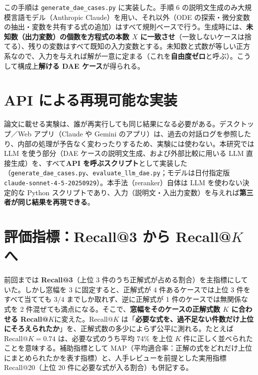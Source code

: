 \documentclass[11pt,a4paper]{ltjsarticle}
\begin{document}
この手順は \texttt{generate\_dae\_cases.py} に実装した。手順 6 の説明文生成のみ大規模言語モデル（Anthropic Claude）を用い、それ以外（ODE の探索・微分変数の抽出・変数を共有する式の追加）はすべて規則ベースで行う。生成時には、\textbf{未知数（出力変数）の個数を方程式の本数 $X$ に一致させ}（一致しないケースは捨てる）、残りの変数はすべて既知の入力変数とする。未知数と式数が等しい正方系なので、入力を与えれば解が一意に定まる（これを\textbf{自由度ゼロ}と呼ぶ）。こうして構成上\textbf{解ける DAE ケース}が得られる。

\section{API による再現可能な実装}\label{sec:api}
論文に載せる実験は、誰が再実行しても同じ結果になる必要がある。デスクトップ／Web アプリ（Claude や Gemini のアプリ）は、過去の対話ログを参照したり、内部の処理が予告なく変わったりするため、実験には使わない。本研究では LLM を使う部分（DAE ケースの説明文生成、および外部比較に用いる LLM 直接生成）を、すべて\textbf{API を呼ぶスクリプト}として実装した（\texttt{generate\_dae\_cases.py}、\texttt{evaluate\_llm\_dae.py}；モデルは日付指定版 \texttt{claude-sonnet-4-5-20250929}）。本手法（reranker）自体は LLM を使わない決定的な Python スクリプトであり、入力（説明文・入出力変数）を与えれば\textbf{第三者が同じ結果を再現できる}。

\section{評価指標：Recall@3 から Recall@$K$ へ}\label{sec:metric}
前回までは \textbf{Recall@3}（上位 3 件のうち正解式が占める割合）を主指標にしていた。しかし窓幅を 3 に固定すると、正解式が 4 件あるケースでは上位 3 件をすべて当てても $3/4$ までしか取れず、逆に正解式が 1 件のケースでは無関係な式を 2 件混ぜても満点になる。そこで、\textbf{窓幅をそのケースの正解式数 $K$ に合わせる Recall@$K$}に変えた。Recall@$K$ は「\textbf{必要な式を、過不足ない件数だけ上位にそろえられたか}」を、正解式数の多少によらず公平に測れる。たとえば Recall@$K=0.74$ は、必要な式のうち平均 74\% を上位 $K$ 件に正しく並べられたことを意味する。補助指標として MAP（平均適合率：正解の式をどれだけ上位にまとめられたかを表す指標）と、人手レビューを前提とした実用指標 Recall@20（上位 20 件に必要な式が入る割合）も併記する。
\end{document}

